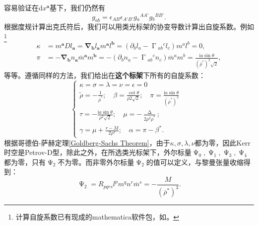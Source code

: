 容易验证在$\mathrm{d} x^{\boldsymbol{a}}$基下，我们仍然有
\begin{equation*}
	g_{ab} =\epsilon _{AB} \epsilon _{A'B'} g{_{a}}^{AA'} g{_{b}}^{BB'} .
\end{equation*}
根据度规计算出克氏符后，我们可以用类光标架的协变导数计算出自旋系数。例如\footnote{计算自旋系数已有现成的mathematica软件包，如\parencite{hasmani_algebraic_2011,gomez2012spinors}。}
\begin{equation*}
	\begin{aligned}
		\kappa  & =m^{\boldsymbol{a}} Dl_{\boldsymbol{a}} =\mathbf{\nabla }_{\boldsymbol{b}} l_{\boldsymbol{a}} m^{\boldsymbol{a}} l^{\boldsymbol{b}} =(\partial _{b} l_{a} -\upGamma {_{ab}}^{c} l_{c} )m^{a} l^{b} =0,\\
		\pi  & =-\mathbf{\nabla }_{\boldsymbol{b}} n_{\boldsymbol{a}}\overline{m}^{\boldsymbol{a}} m^{\boldsymbol{b}} =-(\partial _{b} n_{a} -\upGamma {_{ab}}^{c} n_{c} )\overline{m}^{a} m^{b} =\frac{\mathrm{i} a\sin \theta }{(\overline{\rho }^{*} )^{2}\sqrt{2}} ,
	\end{aligned}
\end{equation*}
等等。遵循同样的方法，我们给出在\textbf{这个标架}下所有的自旋系数：
\begin{equation*}
	\begin{cases}
		\kappa =\sigma =\lambda =\nu =\epsilon =0 & \\
		\tilde{\rho } =-\frac{1}{\overline{\rho }^{*}} ;\quad \beta =\frac{\cot \theta }{\overline{\rho } 2\sqrt{2}} ;\quad \pi =\frac{\mathrm{i} a\sin \theta }{(\overline{\rho }^{*} )^{2}} & \\
		\tau =-\frac{\mathrm{i} a\sin \theta }{\rho ^{2}\sqrt{2}} ;\quad \mu =-\frac{\upDelta }{2\rho ^{2}\overline{\rho }^{*}} ; & \\
		\gamma =\mu +\frac{r-M}{2\rho ^{2}} ;\quad \alpha =\pi -\beta ^{*} . & 
	\end{cases}
\end{equation*}
根据哥德伯-萨赫定理\ref{Goldberg-Sachs Theorem}，由于$\kappa ,\sigma ,\lambda ,\nu $都为零，因此Kerr时空是Petrov-D型，除此之外，在所选类光标架下，外尔标量$\upPsi _{0} ,\upPsi _{1} ,\upPsi _{3} ,\upPsi _{4}$都为零，只有$\upPsi _{2}$不为零。而非零外尔标量$\upPsi _{2}$的值可以定义，与黎曼张量收缩得到：
\begin{equation*}
	\upPsi _{2} =R_{pqrs} l^{p} m^{q} n^{r}\overline{m}^{s} =-\frac{M}{(\overline{\rho }^{*} )^{3}} .
\end{equation*}



